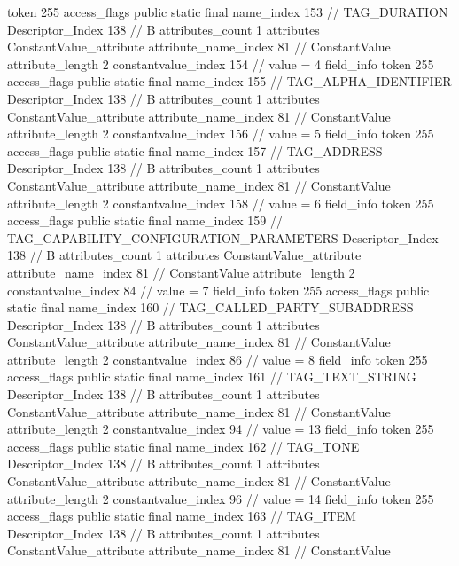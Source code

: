 {{{{{				token	255
				access_flags	public static final
				name_index	153		// TAG_DURATION
				Descriptor_Index	138		// B
				attributes_count	1
				attributes {
				ConstantValue_attribute {
					attribute_name_index	81		// ConstantValue
					attribute_length	2
					constantvalue_index	154		// value = 4
				}
				}
			}
			field_info {
				token	255
				access_flags	public static final
				name_index	155		// TAG_ALPHA_IDENTIFIER
				Descriptor_Index	138		// B
				attributes_count	1
				attributes {
				ConstantValue_attribute {
					attribute_name_index	81		// ConstantValue
					attribute_length	2
					constantvalue_index	156		// value = 5
				}
				}
			}
			field_info {
				token	255
				access_flags	public static final
				name_index	157		// TAG_ADDRESS
				Descriptor_Index	138		// B
				attributes_count	1
				attributes {
				ConstantValue_attribute {
					attribute_name_index	81		// ConstantValue
					attribute_length	2
					constantvalue_index	158		// value = 6
				}
				}
			}
			field_info {
				token	255
				access_flags	public static final
				name_index	159		// TAG_CAPABILITY_CONFIGURATION_PARAMETERS
				Descriptor_Index	138		// B
				attributes_count	1
				attributes {
				ConstantValue_attribute {
					attribute_name_index	81		// ConstantValue
					attribute_length	2
					constantvalue_index	84		// value = 7
				}
				}
			}
			field_info {
				token	255
				access_flags	public static final
				name_index	160		// TAG_CALLED_PARTY_SUBADDRESS
				Descriptor_Index	138		// B
				attributes_count	1
				attributes {
				ConstantValue_attribute {
					attribute_name_index	81		// ConstantValue
					attribute_length	2
					constantvalue_index	86		// value = 8
				}
				}
			}
			field_info {
				token	255
				access_flags	public static final
				name_index	161		// TAG_TEXT_STRING
				Descriptor_Index	138		// B
				attributes_count	1
				attributes {
				ConstantValue_attribute {
					attribute_name_index	81		// ConstantValue
					attribute_length	2
					constantvalue_index	94		// value = 13
				}
				}
			}
			field_info {
				token	255
				access_flags	public static final
				name_index	162		// TAG_TONE
				Descriptor_Index	138		// B
				attributes_count	1
				attributes {
				ConstantValue_attribute {
					attribute_name_index	81		// ConstantValue
					attribute_length	2
					constantvalue_index	96		// value = 14
				}
				}
			}
			field_info {
				token	255
				access_flags	public static final
				name_index	163		// TAG_ITEM
				Descriptor_Index	138		// B
				attributes_count	1
				attributes {
				ConstantValue_attribute {
					attribute_name_index	81		// ConstantValue
}}}}}}}
